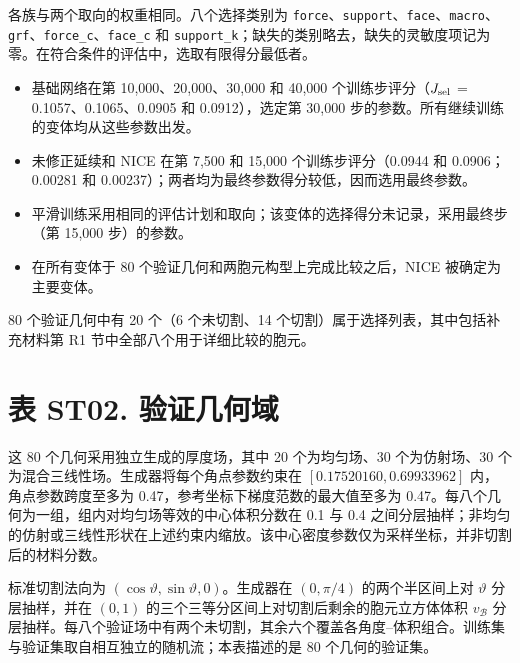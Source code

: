 \documentclass[preprint,12pt,authoryear]{elsarticle}
\providecommand{\tightlist}{\setlength{\itemsep}{0pt}\setlength{\parskip}{0pt}}
\begin{document}
各族与两个取向的权重相同。八个选择类别为 \texttt{force}、\texttt{support}、\texttt{face}、\texttt{macro}、\texttt{grf}、\texttt{force\_c}、\texttt{face\_c} 和 \texttt{support\_k}；缺失的类别略去，缺失的灵敏度项记为零。在符合条件的评估中，选取有限得分最低者。

\begin{itemize}
\tightlist
\item
  基础网络在第 10,000、20,000、30,000 和 40,000 个训练步评分（\(J_{\rm sel}\) = 0.1057、0.1065、0.0905 和 0.0912），选定第 30,000 步的参数。所有继续训练的变体均从这些参数出发。
\item
  未修正延续和 NICE 在第 7,500 和 15,000 个训练步评分（0.0944 和 0.0906；0.00281 和 0.00237）；两者均为最终参数得分较低，因而选用最终参数。
\item
  平滑训练采用相同的评估计划和取向；该变体的选择得分未记录，采用最终步（第 15,000 步）的参数。
\item
  在所有变体于 80 个验证几何和两胞元构型上完成比较之后，NICE 被确定为主要变体。
\end{itemize}

80 个验证几何中有 20 个（6 个未切割、14 个切割）属于选择列表，其中包括补充材料第 R1 节中全部八个用于详细比较的胞元。

\section{表 ST02. 验证几何域}

这 80 个几何采用独立生成的厚度场，其中 20 个为均匀场、30 个为仿射场、30 个为混合三线性场。生成器将每个角点参数约束在 \([0.17520160,0.69933962]\) 内，角点参数跨度至多为 0.47，参考坐标下梯度范数的最大值至多为 0.47。每八个几何为一组，组内对均匀场等效的中心体积分数在 0.1 与 0.4 之间分层抽样；非均匀的仿射或三线性形状在上述约束内缩放。该中心密度参数仅为采样坐标，并非切割后的材料分数。

标准切割法向为 \((\cos\vartheta,\sin\vartheta,0)\)。生成器在 \((0,\pi/4)\) 的两个半区间上对 \(\vartheta\) 分层抽样，并在 \((0,1)\) 的三个三等分区间上对切割后剩余的胞元立方体体积 \(v_{\mathcal B}\) 分层抽样。每八个验证场中有两个未切割，其余六个覆盖各角度--体积组合。训练集与验证集取自相互独立的随机流；本表描述的是 80 个几何的验证集。
\end{document}
